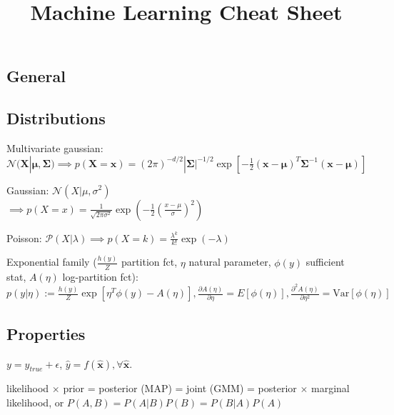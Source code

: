 \documentclass[10pt,a4paper,landscape]{extarticle}
\renewcommand{\bf}[1]{\ensuremath{\mathbf{#1}}}
\newcommand{\Var}{\mathrm{Var}}
\begin{document}
\title{Machine Learning Cheat Sheet}

\raggedright
\footnotesize
\sffamily

\setlength{\columnsep}{0.5pt}
\setlength{\columnseprule}{0.25pt}

\begin{multicols*}{4}



\section{General}
\subsection{Distributions}
Multivariate gaussian: $\mathcal{N}(\bf{X} | \bf{\mu} , \bf{\Sigma})
\implies p(\bf{X} = \bf{x}) = (2 \pi)^{-d/2} |\bf{\Sigma|}^{-1/2} \exp{[- \frac{1}{2} (\bf{x} - \bf{\mu})^T \bf{\Sigma}^{-1} (\bf{x} - \bf{\mu})]}$

Gaussian: $\mathcal{N}(X| \mu, \sigma^2)$ \\
$\implies p(X = x) = \frac{1}{\sqrt{2 \pi \sigma^2}} \exp{(- \frac{1}{2} ( \frac{x - \mu}{\sigma} )^2)}$

Poisson: $\mathcal{P}(X| \lambda)
\implies p(X = k) = \frac{\lambda ^ k}{k!} \exp{(- \lambda)}$

Exponential family ($\frac{h(y)}{Z}$ partition fct, $\eta$ natural parameter, $\phi(y)$ sufficient stat, $A(\eta)$ log-partition fct):
$p(y|\eta) := \frac{h(y)}{Z} \exp[\eta^T \phi(y) - A(\eta)], \frac{\partial A(\eta)}{\partial \eta} = E[\phi(\eta)], \frac{\partial^2 A(\eta)}{\partial \eta^2} = \Var[\phi(\eta)]$

\subsection{Properties}
$y = y_{true} + \epsilon$, $\hat{y} = f(\bf{\hat{x}}), \forall \bf{\hat{x}}$.

likelihood $\times$ prior = posterior (MAP) = joint (GMM) = posterior $\times$ marginal likelihood, or 
$P(A,B) = P(A|B) P(B) = P(B | A) P(A)$


\end{multicols*}
\end{document}
